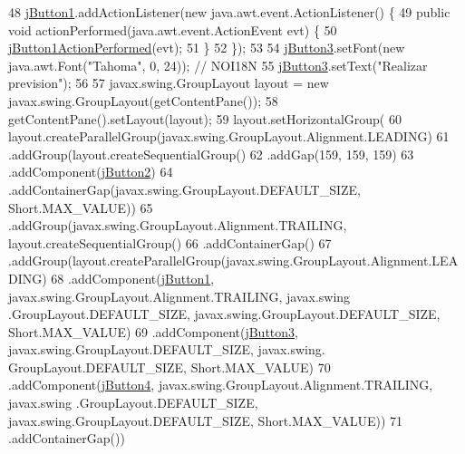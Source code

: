 \begin{DoxyCode}
48         \mbox{\hyperlink{classinterfacessoguar_1_1elegirasistente_a07a589d7d398109bec67c508df5c7ecd}{jButton1}}.addActionListener(\textcolor{keyword}{new} java.awt.event.ActionListener() \{
49             \textcolor{keyword}{public} \textcolor{keywordtype}{void} actionPerformed(java.awt.event.ActionEvent evt) \{
50                 \mbox{\hyperlink{classinterfacessoguar_1_1elegirasistente_a55c409487b826b045083e8ca0a748598}{jButton1ActionPerformed}}(evt);
51             \}
52         \});
53 
54         \mbox{\hyperlink{classinterfacessoguar_1_1elegirasistente_a856391f7b77755ef9c4272b75d0e7d08}{jButton3}}.setFont(\textcolor{keyword}{new} java.awt.Font(\textcolor{stringliteral}{"Tahoma"}, 0, 24)); \textcolor{comment}{// NOI18N}
55         \mbox{\hyperlink{classinterfacessoguar_1_1elegirasistente_a856391f7b77755ef9c4272b75d0e7d08}{jButton3}}.setText(\textcolor{stringliteral}{"Realizar prevision"});
56 
57         javax.swing.GroupLayout layout = \textcolor{keyword}{new} javax.swing.GroupLayout(getContentPane());
58         getContentPane().setLayout(layout);
59         layout.setHorizontalGroup(
60             layout.createParallelGroup(javax.swing.GroupLayout.Alignment.LEADING)
61             .addGroup(layout.createSequentialGroup()
62                 .addGap(159, 159, 159)
63                 .addComponent(\mbox{\hyperlink{classinterfacessoguar_1_1elegirasistente_a6522f7eb0d070434d11b803b11bcd34b}{jButton2}})
64                 .addContainerGap(javax.swing.GroupLayout.DEFAULT\_SIZE, Short.MAX\_VALUE))
65             .addGroup(javax.swing.GroupLayout.Alignment.TRAILING, layout.createSequentialGroup()
66                 .addContainerGap()
67                 .addGroup(layout.createParallelGroup(javax.swing.GroupLayout.Alignment.LEADING)
68                     .addComponent(\mbox{\hyperlink{classinterfacessoguar_1_1elegirasistente_a07a589d7d398109bec67c508df5c7ecd}{jButton1}}, javax.swing.GroupLayout.Alignment.TRAILING, javax.swing
      .GroupLayout.DEFAULT\_SIZE, javax.swing.GroupLayout.DEFAULT\_SIZE, Short.MAX\_VALUE)
69                     .addComponent(\mbox{\hyperlink{classinterfacessoguar_1_1elegirasistente_a856391f7b77755ef9c4272b75d0e7d08}{jButton3}}, javax.swing.GroupLayout.DEFAULT\_SIZE, javax.swing.
      GroupLayout.DEFAULT\_SIZE, Short.MAX\_VALUE)
70                     .addComponent(\mbox{\hyperlink{classinterfacessoguar_1_1elegirasistente_a5b4ead7537cc84f35f56c57ca95f3217}{jButton4}}, javax.swing.GroupLayout.Alignment.TRAILING, javax.swing
      .GroupLayout.DEFAULT\_SIZE, javax.swing.GroupLayout.DEFAULT\_SIZE, Short.MAX\_VALUE))
71                 .addContainerGap())

\end{DoxyCode}
